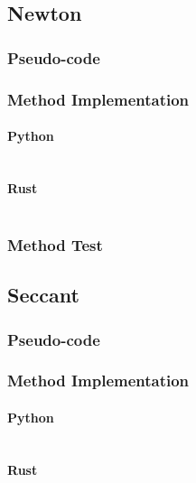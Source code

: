 \documentclass{article}
\begin{document}
    \subsection{Newton}
        \subsubsection{Pseudo-code}
        \subsubsection{Method Implementation}
            \paragraph{Python}
                \begin{verbatim}
                \end{verbatim}
            \paragraph{Rust}
                \begin{verbatim}
                \end{verbatim}
        \subsubsection{Method Test}

    \subsection{Seccant}
        \subsubsection{Pseudo-code}
        \subsubsection{Method Implementation}
            \paragraph{Python}
                \begin{verbatim}
                \end{verbatim}
            \paragraph{Rust}
                \begin{verbatim}
                \end{verbatim}
\end{document}
